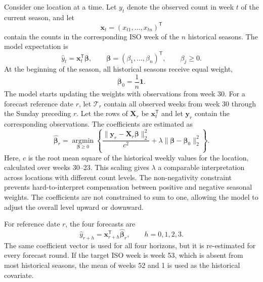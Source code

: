 \documentclass[10pt,a4paper]{article}
\begin{document}
Consider one location at a time. Let $y_t$ denote the observed count in week
$t$ of the current season, and let
\[
  \mathbf{x}_t=(x_{t1},\ldots,x_{tn})^{\mathsf T}
\]
contain the counts in the corresponding ISO week of the $n$ historical
seasons. The model expectation is
\begin{equation}
  \widehat y_t = \mathbf{x}_t^{\mathsf T}\boldsymbol\beta,
  \qquad \boldsymbol\beta=(\beta_1,\ldots,\beta_n)^{\mathsf T},
  \qquad \beta_j\geq 0.
  \label{eq:forecast}
\end{equation}
At the beginning of the season, all historical seasons receive equal weight,
\begin{equation}
  \boldsymbol\beta_0=\frac{1}{n}\mathbf{1}.
  \label{eq:prior}
\end{equation}
The model starts updating the weights with observations from week 30. For a
forecast reference date $r$, let $\mathcal T_r$ contain all observed weeks from
week 30 through the Sunday preceding $r$. Let the rows of $\mathbf X_r$ be
$\mathbf{x}_t^{\mathsf T}$ and let $\mathbf y_r$ contain the corresponding
observations. The coefficients are estimated as
\begin{equation}
  \widehat{\boldsymbol\beta}_r=
  \underset{\boldsymbol\beta\geq0}{\operatorname{argmin}}
  \left\{
  \frac{\lVert\mathbf y_r-\mathbf X_r\boldsymbol\beta\rVert_2^2}{c^2}
  +\lambda\lVert\boldsymbol\beta-\boldsymbol\beta_0\rVert_2^2
  \right\}.
  \label{eq:ridge}
\end{equation}
Here, $c$ is the root mean square of the historical weekly values for the
location, calculated over weeks 30--23. This scaling gives $\lambda$ a
comparable interpretation across locations with different count levels. The
non-negativity constraint prevents hard-to-interpret compensation between
positive and negative seasonal weights. The coefficients are not constrained
to sum to one, allowing the model to adjust the overall level upward or
downward.

For reference date $r$, the four forecasts are
\begin{equation}
  \widehat y_{r+h}=\mathbf{x}_{r+h}^{\mathsf T}
  \widehat{\boldsymbol\beta}_r,\qquad h=0,1,2,3.
  \label{eq:horizons}
\end{equation}
The same coefficient vector is used for all four horizons, but it is
re-estimated for every forecast round. If the target ISO week is week 53,
which is absent from most historical seasons, the mean of weeks 52 and 1 is
used as the historical covariate.
\end{document}
